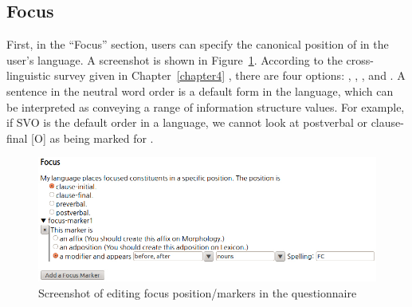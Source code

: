 \subsection{Focus}
\label{11:ssec:questionnaire-focus}


First, in the ``Focus'' section, users can specify the canonical
position of  in the user's language. A screenshot is shown in
Figure~\ref{screenshot:focus}.  According to the cross-linguistic
survey given in Chapter~\ref{chapter4}
, there are four options:
, , , and
.  A sentence in the neutral word order is a default
form in the language, which can be interpreted as conveying a range of
information structure values. For example, if SVO is the default order
in a language, we cannot look at postverbal or clause-final [O] as
being marked for
.



\begin{figure} 
\begin{center} 
\includegraphics[width=.9\textwidth]{screenshot/focus.jpg}
\caption{Screenshot of editing focus position/markers in the questionnaire}
\label{screenshot:focus}
\end{center}
\end{figure}

